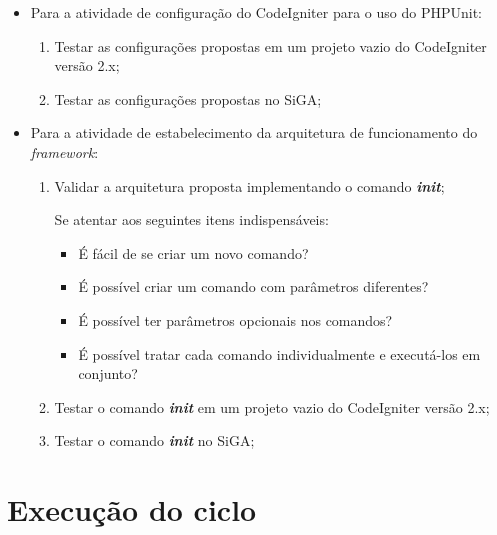 	  \begin{itemize}
	  
	    \item Para a atividade de configuração do CodeIgniter para o uso do PHPUnit:
	  
		\begin{enumerate}
	      
		  \item Testar as configurações propostas em um projeto vazio do CodeIgniter versão 2.x;
		  
		  \item Testar as configurações propostas no SiGA;
		  
		\end{enumerate}
	      
	    \item Para a atividade de estabelecimento da arquitetura de funcionamento do \textit{framework}:
		
		\begin{enumerate}
	      
		  \item Validar a arquitetura proposta implementando o comando \textit{\textbf{init}};
		      
		      \subitem Se atentar aos seguintes itens indispensáveis:
			\begin{itemize}
			  \item É fácil de se criar um novo comando?
			  \item É possível criar um comando com parâmetros diferentes?
			  \item É possível ter parâmetros opcionais nos comandos?
			  \item É possível tratar cada comando individualmente e executá-los em conjunto?
			\end{itemize}
		  
		  \item Testar o comando \textit{\textbf{init}} em um projeto vazio do CodeIgniter versão 2.x;
		  
		  \item Testar o comando \textit{\textbf{init}} no SiGA;
		  
		\end{enumerate}
	  
	  \end{itemize}


  
  \section{Execução do ciclo}
  
